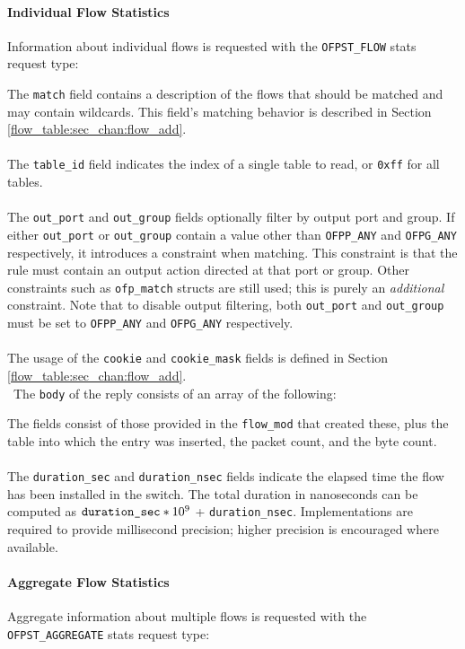 \paragraph{Individual Flow Statistics}
Information about individual flows is requested with the \verb|OFPST_FLOW| stats request type:


The \verb|match| field contains a description of the flows that should be matched and may contain wildcards.  This field's matching behavior is described in Section \ref{flow_table:sec_chan:flow_add}.
\\\\
The \verb|table_id| field indicates the index of a single table to read, or \verb|0xff| for all tables.
\\\\
The \verb|out_port| and \verb|out_group| fields optionally filter by output port and group.  If either \verb|out_port| or \verb|out_group| contain a value other than \verb|OFPP_ANY| and \verb|OFPG_ANY| respectively, it introduces a constraint when matching.  This constraint is that the rule must contain an output action directed at that port or group.  Other constraints such as \verb|ofp_match| structs are still used; this is purely an \emph{additional} constraint.  Note that to disable output filtering, both \verb|out_port| and \verb|out_group| must be set to \verb|OFPP_ANY| and \verb|OFPG_ANY| respectively.
\\\\
The usage of the \verb|cookie| and \verb|cookie_mask| fields is defined in Section \ref{flow_table:sec_chan:flow_add}.
\\\
The \verb|body| of the reply consists of an array of the following:


The fields consist of those provided in the \verb|flow_mod| that created these, plus the table into which the entry was inserted, the packet count, and the byte count.
\\\\
\label{flow_duration_info}The \verb|duration_sec| and \verb|duration_nsec| fields indicate the elapsed time the flow has been installed in the switch. The total duration in nanoseconds can be computed as $\verb|duration_sec|*10^{9}$ + \verb|duration_nsec|. Implementations are required to provide millisecond precision; higher precision is encouraged where available.

\paragraph{Aggregate Flow Statistics}
Aggregate information about multiple flows is requested with the \verb|OFPST_AGGREGATE| stats request type:


